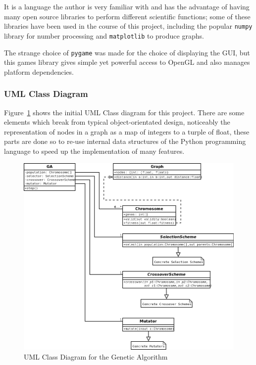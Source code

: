 \documentclass[10pt, a4paper]{article}
\begin{document}
It is a language the author is very familiar with and has the advantage of
having many open source libraries to perform different scientific functions;
some of these libraries have been used in the course of this project, including
the popular \texttt{numpy} library for number processing and \texttt{matplotlib}
to produce graphs.

The strange choice of \texttt{pygame} was made for the choice of displaying the
GUI, but this games library gives simple yet powerful access to OpenGL and also
manages platform dependencies.

\subsubsection{UML Class Diagram}

Figure~\ref{fig:uml} shows the initial UML Class diagram for this project.
There are some elements which break from typical object-orientated design,
noticeably the representation of nodes in a graph as a map of integers to a
turple of float, these parts are done so to re-use internal data structures of
the Python programming language to speed up the implementation of many 
features.

\begin{figure}[h]
\includegraphics[width=\textwidth]{img/uml.png}
\caption{UML Class Diagram for the Genetic Algorithm}
\label{fig:uml}
\end{figure}
\end{document}
